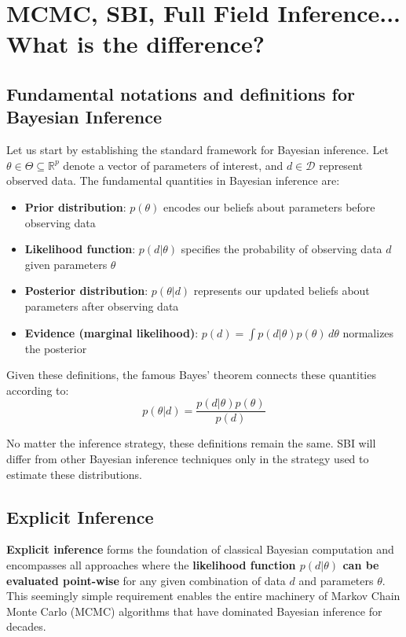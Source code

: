\documentclass[11pt,a4paper]{article}
\theoremstyle{definition}
\begin{document}
\section{MCMC, SBI, Full Field Inference... What is the difference?}

\subsection{Fundamental notations and definitions for Bayesian Inference}

Let us start by establishing the standard framework for Bayesian inference. Let $\theta \in \Theta \subseteq \mathbb{R}^p$ denote a vector of parameters of interest, and $d \in \mathcal{D}$ represent observed data. The fundamental quantities in Bayesian inference are:

\begin{itemize}
    \item \textbf{Prior distribution}: $p(\theta)$ encodes our beliefs about parameters before observing data
    \item \textbf{Likelihood function}: $p(d|\theta)$ specifies the probability of observing data $d$ given parameters $\theta$
    \item \textbf{Posterior distribution}: $p(\theta|d)$ represents our updated beliefs about parameters after observing data
    \item \textbf{Evidence (marginal likelihood)}: $p(d) = \int p(d|\theta)p(\theta) \, d\theta$ normalizes the posterior
\end{itemize}

Given these definitions, the famous Bayes' theorem connects these quantities according to:
\begin{equation}
    \boxed{p(\theta|d) = \frac{p(d|\theta)p(\theta)}{p(d)}}
\end{equation}

No matter the inference strategy, these definitions remain the same. SBI will differ from other Bayesian inference techniques only in the strategy used to estimate these distributions. 

\subsection{Explicit Inference}

\textbf{Explicit inference} forms the foundation of classical Bayesian computation and encompasses all approaches where the \textbf{likelihood function $p(d|\theta)$ can be evaluated point-wise} for any given combination of data $d$ and parameters $\theta$. This seemingly simple requirement enables the entire machinery of Markov Chain Monte Carlo (MCMC) algorithms that have dominated Bayesian inference for decades.
\end{document}
